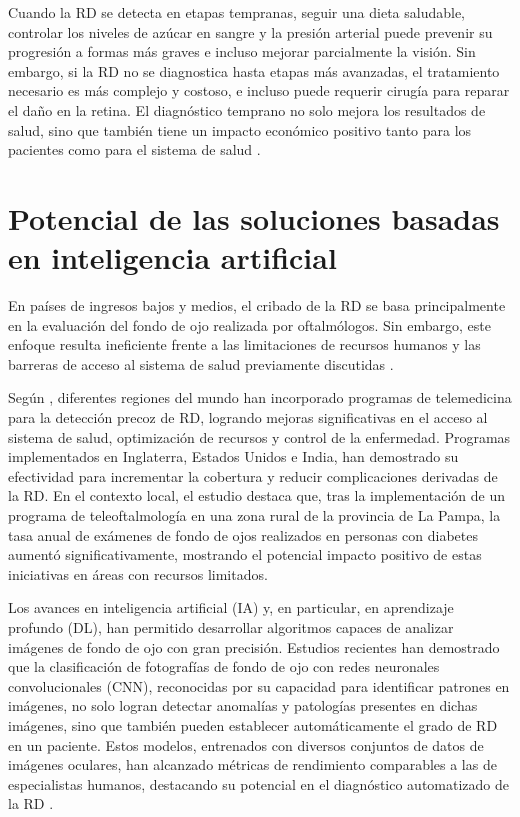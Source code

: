Cuando la RD se detecta en etapas tempranas, seguir una dieta saludable, controlar los niveles de azúcar en sangre y la presión arterial puede prevenir su progresión a formas más graves e incluso mejorar parcialmente la visión. Sin embargo, si la RD no se diagnostica hasta etapas más avanzadas, el tratamiento necesario es más complejo y costoso, e incluso puede requerir cirugía para reparar el daño en la retina. El diagnóstico temprano no solo mejora los resultados de salud, sino que también tiene un impacto económico positivo tanto para los pacientes como para el sistema de salud \parencites{aao2023}.


\section{Potencial de las soluciones basadas en inteligencia artificial}
En países de ingresos bajos y medios, el cribado de la RD se basa principalmente en la evaluación del fondo de ojo realizada por oftalmólogos. Sin embargo, este enfoque resulta ineficiente frente a las limitaciones de recursos humanos y las barreras de acceso al sistema de salud previamente discutidas \parencites{piyasena2018}.

Según \cite{ortizbasso2023}, diferentes regiones del mundo han incorporado programas de telemedicina para la detección precoz de RD, logrando mejoras significativas en el acceso al sistema de salud, optimización de recursos y control de la enfermedad. Programas implementados en Inglaterra, Estados Unidos e India, han demostrado su efectividad para incrementar la cobertura y reducir complicaciones derivadas de la RD. En el contexto local, el estudio destaca que, tras la implementación de un programa de teleoftalmología en una zona rural de la provincia de La Pampa, la tasa anual de exámenes de fondo de ojos realizados en personas con diabetes aumentó significativamente, mostrando el potencial impacto positivo de estas iniciativas en áreas con recursos limitados.

Los avances en inteligencia artificial (IA) y, en particular, en aprendizaje profundo (DL), han permitido desarrollar algoritmos capaces de analizar imágenes de fondo de ojo con gran precisión. Estudios recientes han demostrado que la clasificación de fotografías de fondo de ojo con redes neuronales convolucionales (CNN), reconocidas por su capacidad para identificar patrones en imágenes, no solo logran detectar anomalías y patologías presentes en dichas imágenes, sino que también pueden establecer automáticamente el grado de RD en un paciente. Estos modelos, entrenados con diversos conjuntos de datos de imágenes oculares, han alcanzado métricas de rendimiento comparables a las de especialistas humanos, destacando su potencial en el diagnóstico automatizado de la RD \parencites{cuello2020}.

